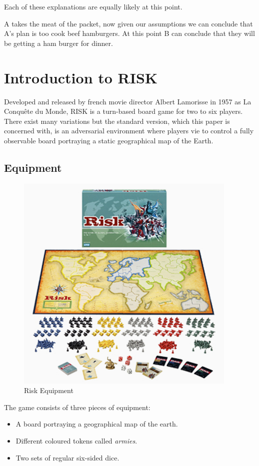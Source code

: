 \documentclass[parskip]{cs4rep}
\begin{document}
Each of these explanations are equally likely at this point.

A takes the meat of the packet, now given our assumptions we can conclude that A's plan is too cook beef hamburgers. At this point B can conclude that they will be getting a ham burger for dinner.

\newpage

\section{Introduction to RISK}

Developed and released by french movie director Albert Lamorisse in 1957 as La Conqu\^ete du Monde, RISK is a turn-based board game for two to six players. There exist many variations but the standard version, which this paper is concerned with, is an adversarial environment where players vie to control a fully observable board portraying a static geographical map of the Earth.

\subsection{Equipment}

\begin{figure}[h]
\centering
\includegraphics{images/risk-board}
\caption{Risk Equipment}
\label{fig:risk-equipment}
\end{figure}

The game consists of three pieces of equipment:

\begin{itemize}
\item
A board portraying a geographical map of the earth.
\item
Different coloured tokens called \textit{armies}.
\item
Two sets of regular six-sided dice.
\end{itemize}
\end{document}
